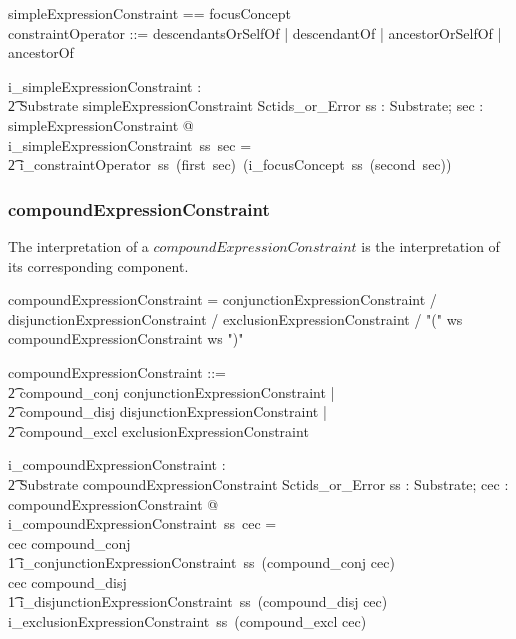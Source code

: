 \documentclass{article}
\def\bnf#1{{\scriptsize {{#1}} }}
\begin{document}
\begin{zed}
simpleExpressionConstraint == \optional[constraintOperator] \cross focusConcept \\
constraintOperator ::= descendantsOrSelfOf | descendantOf | ancestorOrSelfOf | ancestorOf
\end{zed} 

\begin{gendef}
   i\_simpleExpressionConstraint : \\
\t2 Substrate \fun simpleExpressionConstraint \fun Sctids\_or\_Error
\where
   \forall ss : Substrate; sec : simpleExpressionConstraint @ \\
i\_simpleExpressionConstraint~ss~sec =  \\
\t2 i\_constraintOperator~ss~(first~sec)~(i\_focusConcept~ss~(second~sec))
\end{gendef}


\subsubsection{compoundExpressionConstraint}
The interpretation of a $compoundExpressionConstraint$ is the interpretation of its corresponding component.
\begin{framed}
\noindent
\bnf{compoundExpressionConstraint = conjunctionExpressionConstraint / 
	disjunctionExpressionConstraint / exclusionExpressionConstraint / 
	"(" ws compoundExpressionConstraint ws ")"}
\end{framed}

\begin{zed}
compoundExpressionConstraint ::= \\
\t2 compound\_conj \ldata conjunctionExpressionConstraint \rdata | \\
\t2 compound\_disj \ldata disjunctionExpressionConstraint \rdata | \\
\t2 compound\_excl \ldata exclusionExpressionConstraint \rdata 
\end{zed}

\begin{gendef}
   i\_compoundExpressionConstraint : \\
\t2 Substrate \fun compoundExpressionConstraint \fun Sctids\_or\_Error
\where
  \forall ss : Substrate; cec : compoundExpressionConstraint @ \\
 i\_compoundExpressionConstraint~ss~cec = \\
   \IF cec \in \ran compound\_conj \\
\t1 \THEN i\_conjunctionExpressionConstraint~ss~(compound\_conj \inv cec) \\
    \ELSE \IF cec \in\ran compound\_disj \\
\t1 \THEN i\_disjunctionExpressionConstraint~ss~(compound\_disj \inv cec) \\
    \ELSE i\_exclusionExpressionConstraint~ss~(compound\_excl \inv cec) 
\end{gendef}
\end{document}

